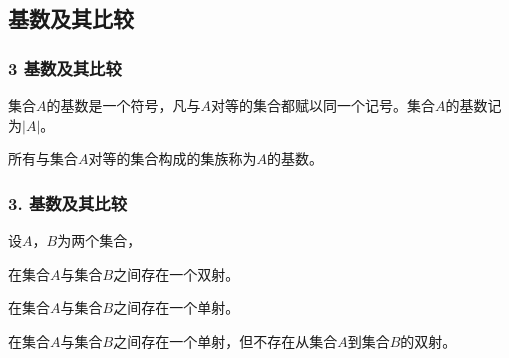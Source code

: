 \documentclass{beamer}
\begin{document}
\begin{CJK*}{UTF8}{gbsn}
\section{基数及其比较}
\begin{frame}
  \frametitle{3 基数及其比较}
  \begin{Def}
    集合$A$的基数是一个符号，凡与$A$对等的集合都赋以同一个记号。集合$A$的基数记为$|A|$。
  \end{Def}\pause
  \begin{Def}
    所有与集合$A$对等的集合构成的集族称为$A$的基数。
  \end{Def}
\end{frame}
\begin{frame}
  \frametitle{3. 基数及其比较}
  设$A$，$B$为两个集合，
  \begin{description}
  \pause\item[$|A|=|B|:$]在集合$A$与集合$B$之间存在一个双射。
  \pause\item[$|A|\leq |B|:$]在集合$A$与集合$B$之间存在一个单射。
  \pause\item[$|A|< |B|:$]在集合$A$与集合$B$之间存在一个单射，但不存在从集合$A$到集合$B$的双射。
  \end{description}
\end{frame}








\end{CJK*}
\end{document}
